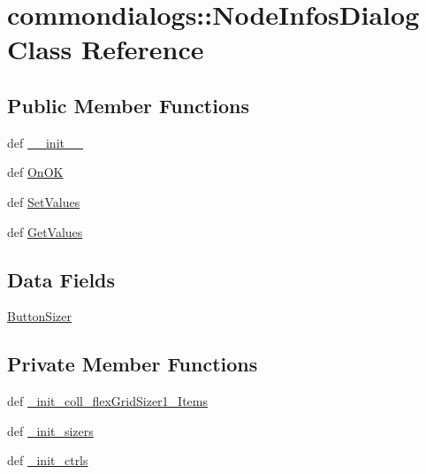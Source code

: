 \hypertarget{classcommondialogs_1_1NodeInfosDialog}{
\section{commondialogs::Node\-Infos\-Dialog Class Reference}
\label{classcommondialogs_1_1NodeInfosDialog}
}
\subsection*{Public Member Functions}
\begin{CompactItemize}
\item 
def \hyperlink{classcommondialogs_1_1NodeInfosDialog_c95f7d4082146239f9278432c3efa6cd}{\_\-\_\-init\_\-\_\-}
\item 
def \hyperlink{classcommondialogs_1_1NodeInfosDialog_28e8dfedd00152d5b389a19f9cf0167f}{On\-OK}
\item 
def \hyperlink{classcommondialogs_1_1NodeInfosDialog_36750076ce1d98da4682c16bc9c00f74}{Set\-Values}
\item 
def \hyperlink{classcommondialogs_1_1NodeInfosDialog_ca7599893a8bfbe3d0b8afca376e9353}{Get\-Values}
\end{CompactItemize}
\subsection*{Data Fields}
\begin{CompactItemize}
\item 
\hyperlink{classcommondialogs_1_1NodeInfosDialog_854b2423bc12e5c04c1e2cb5a683a72f}{Button\-Sizer}
\end{CompactItemize}
\subsection*{Private Member Functions}
\begin{CompactItemize}
\item 
def \hyperlink{classcommondialogs_1_1NodeInfosDialog_d776e64e7aaaecb9ad798efe80588506}{\_\-init\_\-coll\_\-flex\-Grid\-Sizer1\_\-Items}
\item 
def \hyperlink{classcommondialogs_1_1NodeInfosDialog_729b0b3de672a39d4066b2d68523bf93}{\_\-init\_\-sizers}
\item 
def \hyperlink{classcommondialogs_1_1NodeInfosDialog_103b344ad0af9db40eec62456dbf864c}{\_\-init\_\-ctrls}
\end{CompactItemize}



